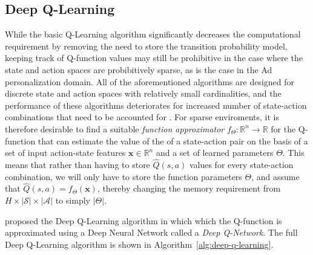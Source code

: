 \documentclass{mldsmsc}
\begin{document}
\subsection{Deep Q-Learning}

While the basic Q-Learning algorithm significantly decreases the computational requirement
by removing the need to store the transition probability model, keeping track of Q-function values
may still be prohibitive in the case where the state and action spaces are probibitively sparse,
as is the case in the Ad personalization domain. All of the aforementioned algorithms are designed
for discrete state and action spaces with relatively small cardinalities, and the performance of these
algorithms deteriorates for increased number of state-action combinations that need to be accounted for \citep{pike-burke2024LearnigAgents}.
For sparse enviroments, it is therefore desirable to find a suitable \emph{function approximator} $f_{\Theta}: \mathbb{R}^n \rightarrow \mathbb{R}$ for the
Q-function that can estimate the value of the of a state-action pair on the basis of a set of input
action-state features $\mathbf{x} \in \mathbb{R}^n$ and a set of learned parameters $\Theta$. This
means that rather than having to store $\hat{Q}(s,a)$ values for every state-action combination,
we will only have to store the function parameters $\Theta$, and assume that $\hat{Q}(s,a) = f_{\Theta}(\mathbf{x})$,
thereby changing the memory requirement from $H \times |\mathcal{S}| \times |\mathcal{A}|$ to simply
$|\Theta|$.

\cite{RefWorks:mnih2015human-level} proposed the Deep Q-Learning algorithm in which
which the Q-function is approximated using a Deep Neural Network called a \emph{Deep Q-Network}.
The full Deep Q-Learning algorithm is shown in Algorithm~\ref{alg:deep-q-learning}.
\end{document}
